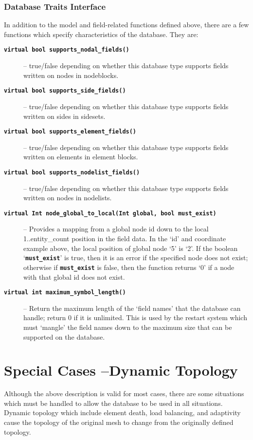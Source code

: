 \documentclass[11pt,twoside]{article}
\newcommand{\code}[1]
   {\mbox{\bf\tt #1}\null}
\begin{document}
\subsubsection{Database Traits Interface}
In addition to the model and field{}-related functions defined above,
there are a few functions which specify characteristics of the
database. They are:

\begin{description}
\item [\code{virtual bool  supports\_nodal\_fields()}]--
true/false depending on whether this database type supports fields
written on nodes in nodeblocks.
\item [\code{virtual bool  supports\_side\_fields()}]-- true/false
depending on whether this database type supports fields written on
sides in sidesets.
\item [\code{virtual bool  supports\_element\_fields()}]--
true/false depending on whether this database type supports fields
written on elements in element blocks.
\item [\code{virtual bool  supports\_nodelist\_fields()}]--
true/false depending on whether this database type supports fields
written on nodes in nodelists.
\item [\code{virtual Int  node\_global\_to\_local(Int global, bool
must\_exist)}]-- Provides a mapping from a global node id down to
the local 1..entity\_count position in the field data. In the `id' and
coordinate example above, the local position of global node `5' is `2'.
If the boolean `\code{must\_exist}' is true, then it is an
error if the specified node does not exist; otherwise if
\code{must\_exist} is false, then the function returns `0' if
a node with that global id does not exist.
\item [\code{virtual int  maximum\_symbol\_length()}]-- Return
the maximum length of the `field names' that the database can handle;
return 0 if it is unlimited. This is used by the restart system which
must `mangle' the field names down to the maximum size that can be
supported on the database.
\end{description}
\section{Special Cases --Dynamic Topology}
Although the above description is valid for most cases, there are some
situations which must be handled to allow the database to be used in
all situations. Dynamic topology which include element death, load
balancing, and adaptivity cause the topology of the original mesh to
change from the originally defined topology.
\end{document}
